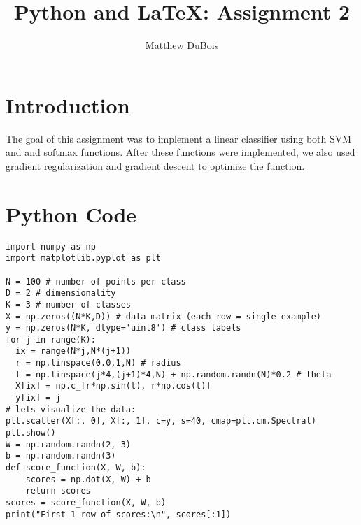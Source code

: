 \documentclass{article}
\begin{document}
\title{Python and LaTeX: Assignment 2}
\author{Matthew DuBois}
\maketitle
\section{Introduction}
The goal of this assignment was to implement a linear classifier using both SVM and and softmax functions. After these functions were implemented, we also used gradient regularization and gradient descent to optimize the function. 
\section{Python Code}

\begin{lstlisting}
import numpy as np
import matplotlib.pyplot as plt

N = 100 # number of points per class
D = 2 # dimensionality
K = 3 # number of classes
X = np.zeros((N*K,D)) # data matrix (each row = single example)
y = np.zeros(N*K, dtype='uint8') # class labels
for j in range(K):
  ix = range(N*j,N*(j+1))
  r = np.linspace(0.0,1,N) # radius
  t = np.linspace(j*4,(j+1)*4,N) + np.random.randn(N)*0.2 # theta
  X[ix] = np.c_[r*np.sin(t), r*np.cos(t)]
  y[ix] = j
# lets visualize the data:
plt.scatter(X[:, 0], X[:, 1], c=y, s=40, cmap=plt.cm.Spectral)
plt.show()
W = np.random.randn(2, 3)
b = np.random.randn(3)
def score_function(X, W, b):
    scores = np.dot(X, W) + b
    return scores
scores = score_function(X, W, b)
print("First 1 row of scores:\n", scores[:1])
\end{lstlisting}
\end{document}
